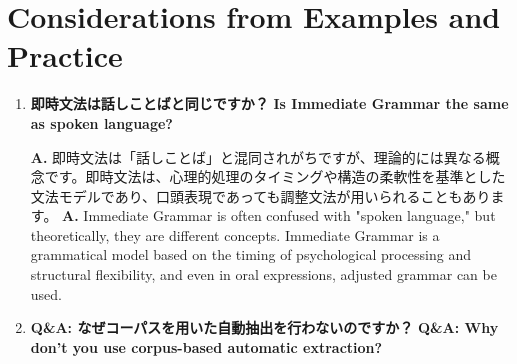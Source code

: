   \section{Considerations from Examples and Practice}
\fi

\begin{enumerate}[resume, label=\textbf{Q\arabic*.}, leftmargin=2em]

  \item \label{qa:20250406a}
\ifJPN
  \textbf{即時文法は話しことばと同じですか？}
\else
  \textbf{Is Immediate Grammar the same as spoken language?}
\fi

\ifJPN
  \textbf{A.} 即時文法は「話しことば」と混同されがちですが、理論的には異なる概念です。即時文法は、心理的処理のタイミングや構造の柔軟性を基準とした文法モデルであり、口頭表現であっても調整文法が用いられることもあります。
\else
  \textbf{A.} Immediate Grammar is often confused with "spoken language," but theoretically, they are different concepts. Immediate Grammar is a grammatical model based on the timing of psychological processing and structural flexibility, and even in oral expressions, adjusted grammar can be used.
\fi

  \item \label{qa:20250406b}
\ifJPN
  \textbf{Q\&A: なぜコーパスを用いた自動抽出を行わないのですか？}
\else
  \textbf{Q\&A: Why don't you use corpus-based automatic extraction?}
\fi


\end{enumerate}
